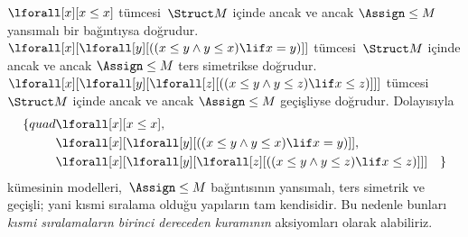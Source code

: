 \begin{ex}
$\lforall[x][x\leq x]$ tümcesi~$\Struct M$ içinde ancak ve ancak
$\Assign\le M$ yansımalı bir bağıntıysa doğrudur.
$\lforall[x][\lforall[y][((x\leq y\land y\leq x)\lif x=y)]]$
tümcesi~$\Struct M$ içinde ancak ve ancak $\Assign\le M$ ters
simetrikse doğrudur.
$\lforall[x][\lforall[y][\lforall[z][((x\leq y\land y\leq z)
\lif x\leq z)]]]$ tümcesi~$\Struct M$ içinde ancak ve ancak
$\Assign\le M$ geçişliyse doğrudur. Dolayısıyla
\begin{align*}
\{quad &\lforall[x][x \le x], \\
   & \lforall[x][\lforall[y][((x \le y \land y \le
    x) \lif x = y)]], \\
   &\lforall[x][\lforall[y][\lforall[z][((x \le y
      \land y \le z) \lif x \le z)]]] \quad \}
\end{align*}
kümesinin modelleri,~$\Assign\le M$ bağıntısının yansımalı, ters
simetrik ve geçişli; yani kısmi sıralama olduğu yapıların tam
kendisidir. Bu nedenle bunları \emph{kısmi sıralamaların birinci
dereceden kuramının} aksiyomları olarak alabiliriz.
\end{ex}

